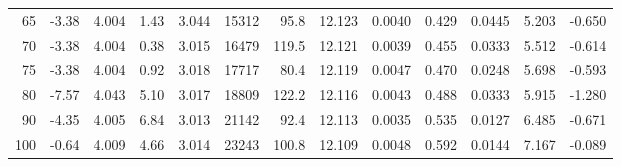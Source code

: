 \documentclass[10pt]{article}
\begin{document}
{\begin{tabular}{|r|rr|rr|rr|rr|rr|r|r|}
       65 &        -3.38 &        4.004 &         1.43 &        3.044 &        15312 &         95.8 &       12.123 &       0.0040 &        0.429 &       0.0445 &        5.203 &       -0.650 \\
       70 &        -3.38 &        4.004 &         0.38 &        3.015 &        16479 &        119.5 &       12.121 &       0.0039 &        0.455 &       0.0333 &        5.512 &       -0.614 \\
       75 &        -3.38 &        4.004 &         0.92 &        3.018 &        17717 &         80.4 &       12.119 &       0.0047 &        0.470 &       0.0248 &        5.698 &       -0.593 \\
       80 &        -7.57 &        4.043 &         5.10 &        3.017 &        18809 &        122.2 &       12.116 &       0.0043 &        0.488 &       0.0333 &        5.915 &       -1.280 \\
       90 &        -4.35 &        4.005 &         6.84 &        3.013 &        21142 &         92.4 &       12.113 &       0.0035 &        0.535 &       0.0127 &        6.485 &       -0.671 \\
      100 &        -0.64 &        4.009 &         4.66 &        3.014 &        23243 &        100.8 &       12.109 &       0.0048 &        0.592 &       0.0144 &        7.167 &       -0.089 \\
\hline
\end{tabular}
}







\pagebreak
\end{document}
